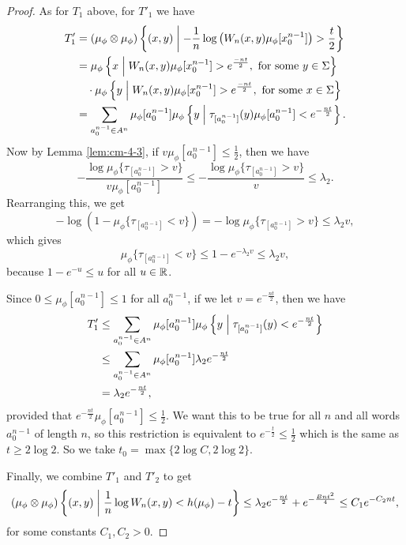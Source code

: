 \begin{theorem}
\begin{proof}
		As for $T_1$ above, for $T'_1$ we have
		\begin{align*}
			T'_1 &= (\mu_\phi \otimes \mu_\phi)\left\{(x, y) \mathrel{}\middle|\mathrel{} -\frac{1}{n}\log\left(W_n(x, y) \mu_\phi[x_0^{n - 1}]\right) > \frac{t}{2}\right\} \\
				&= \mu_\phi\left\{x \mathrel{}\middle|\mathrel{} W_n(x, y) \mu_\phi[x_0^{n - 1}] > e^\frac{-nt}{2}, \text{ for some } y \in \Sigma\right\} \\ 
				&\quad \cdot \mu_\phi\left\{y \mathrel{}\middle|\mathrel{} W_n(x, y) \mu_\phi[x_0^{n - 1}] > e^\frac{-nt}{2}, \text{ for some } x \in \Sigma\right\} \\
				&= \sum_{a_0^{n - 1} \in A^n} \mu_\phi[a_0^{n - 1}]\mu_\phi\left\{y \mathrel{}\middle|\mathrel{} \tau_{[a_0^{n - 1}]}(y) \mu_\phi[a_0^{n - 1}] < e^{-\frac{nt}{2}}\right\}.
		\end{align*}
		Now by Lemma \ref{lem:cm-4-3}, if $v\mu_\phi[a_0^{n - 1}] \leq \frac{1}{2}$, then we have
		\[
			-\frac{\log{\mu_\phi\{\tau_{[a_0^{n - 1}]} > v\}}}{v\mu_\phi[a_0^{n - 1}]} \leq -\frac{\log{\mu_\phi\{\tau_{[a_0^{n - 1}]} > v\}}}{v} \leq \lambda_2.
		\]
		Rearranging this, we get
		\[
			-\log\left(1 - \mu_\phi\{\tau_{[a_0^{n - 1}]} < v\}\right) = -\log{\mu_\phi\{\tau_{[a_0^{n - 1}]} > v\}} \leq \lambda_2 v,
		\]
		which gives
		\[
			\mu_\phi\{\tau_{[a_0^{n - 1}]} < v\} \leq 1 - e^{-\lambda_2 v} \leq \lambda_2 v,
		\]
		because $1 - e^{-u} \leq u$ for all $u \in \mathbb{R}$.
		
		Since $0 \leq \mu_\phi[a_0^{n - 1}] \leq 1$ for all $a_0^{n - 1}$, if we let $v = e^{-\frac{nt}{2}}$, then we have
		\begin{align*}
			T'_1 &\leq \sum_{a_0^{n - 1} \in A^n} \mu_\phi[a_0^{n - 1}]\mu_\phi\left\{y \mathrel{}\middle|\mathrel{} \tau_{[a_0^{n - 1}]}(y) < e^{-\frac{nt}{2}}\right\} \\
				&\leq \sum_{a_0^{n - 1} \in A^n} \mu_\phi[a_0^{n - 1}] \lambda_2 e^{-\frac{nt}{2}} \\
				&= \lambda_2 e^{-\frac{nt}{2}},
		\end{align*}
		provided that $e^{-\frac{nt}{2}}\mu_\phi[a_0^{n - 1}] \leq \frac{1}{2}$. We want this to be true for all $n$ and all words $a_0^{n - 1}$ of length $n$, so this restriction is equivalent to $e^{-\frac{t}{2}} \leq \frac{1}{2}$ which is the same as $t \geq 2\log{2}$. So we take $t_0 = \max\{2\log{C}, 2 \log{2}\}$.
		
		Finally, we combine $T'_1$ and $T'_2$ to get
		\[
			(\mu_\phi \otimes \mu_\phi)\left\{(x, y) \mathrel{}\middle|\mathrel{} \frac{1}{n}\log{W_n(x, y)} < h(\mu_\phi) - t\right\} \leq \lambda_2 e^{-\frac{nt}{2}} + e^{-\frac{Bnt^2}{4}} \leq C_1e^{-C_2 nt},
		\]
		for some constants $C_1, C_2 > 0$.
	\end{proof}
\end{theorem}